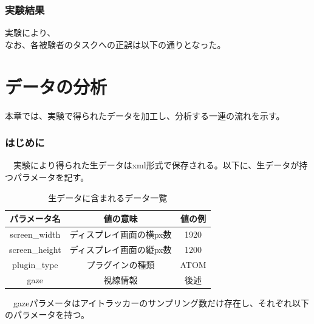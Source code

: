 \documentclass[paper=a4paper,fontsize=10pt]{jlreq}
\begin{document}
  \section{実験結果}
    実験により、\\
    なお、各被験者のタスクへの正誤は以下の通りとなった。\\


\clearpage

\part{データの分析}
  本章では、実験で得られたデータを加工し、分析する一連の流れを示す。

  \section{はじめに}
  　実験により得られた生データはxml形式で保存される。以下に、生データが持つパラメータを記す。\\
    \begin{table}[h]
      \centering
      \caption{生データに含まれるデータ一覧}
      \begin{tabular}{|c|c|c|}
        \hline
        パラメータ名 & 値の意味 & 値の例 \\ \hline
        screen\_width & ディスプレイ画面の横px数 & 1920 \\ \hline
        screen\_height & ディスプレイ画面の縦px数 & 1200 \\ \hline
        plugin\_type & プラグインの種類 & ATOM \\ \hline
        gaze & 視線情報 & 後述 \\ \hline
      \end{tabular}
      \label{tab:basic}
    \end{table}
   \FloatBarrier

  　gazeパラメータはアイトラッカーのサンプリング数だけ存在し、それぞれ以下のパラメータを持つ。
\end{document}
